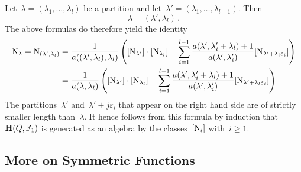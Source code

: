 \documentclass[a4paper,11pt]{scrartcl}
\begin{document}
\begin{remark}
  \label{indecomposables generate hall algebra}
  Let~$\lambda = (\lambda_1, \dotsc, \lambda_l)$ be a partition and let~$\lambda' = (\lambda_1, \dotsc, \lambda_{l-1})$.
  Then
  \[
    \lambda = (\lambda', \lambda_l) \,.
  \]
  The above formulas do therefore yield the identity
  \begin{align}
    \mathrm{N}_\lambda
    =
    \mathrm{N}_{(\lambda', \lambda_l)}
    &=
    \frac{1}{a((\lambda', \lambda_l), \lambda_l)}
    \left(
      [ \mathrm{N}_{\lambda'} ]
      \cdot
      [ \mathrm{N}_{\lambda_l} ]
      -
      \sum_{i=1}^{l-1}
      \frac{ a(\lambda', \lambda'_i + \lambda_l) + 1 }{ a(\lambda', \lambda'_i) }
      [ \mathrm{N}_{\lambda' + \lambda_l \varepsilon_i} ]
    \right)
    \notag
    \\
    &=
    \frac{1}{a(\lambda, \lambda_l)}
    \left(
      [ \mathrm{N}_{\lambda'} ]
      \cdot
      [ \mathrm{N}_{\lambda_l} ]
      -
      \sum_{i=1}^{l-1}
      \frac{ a(\lambda', \lambda'_i + \lambda_l) + 1 }{ a(\lambda', \lambda'_i) }
      [ \mathrm{N}_{\lambda' + \lambda_l \varepsilon_i} ]
    \right)
    \label{identity for representations}
  \end{align}
  The partitions~$\lambda'$ and~$\lambda' + j \varepsilon_i$ that appear on the right hand side are of strictly smaller length than~$\lambda$.
  It hence follows from this formula by induction that~$\mathbf{H}(Q, \mathbb{F}_1)$ is generated as an algebra by the classes~$[\mathrm{N}_i]$ with~$i \geq 1$.
\end{remark}



\subsection{More on Symmetric Functions}
\label{wrong symmetric functions}
\end{document}
